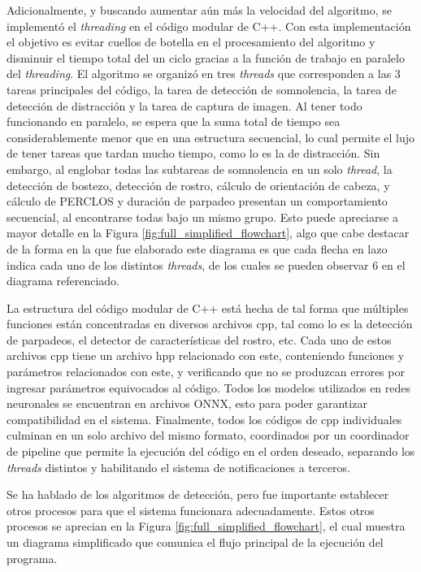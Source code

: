 Adicionalmente, y buscando aumentar aún más la velocidad del algoritmo, se implementó el \textit{threading} en el código modular de C++. Con esta implementación el objetivo es evitar cuellos de botella en el procesamiento del algoritmo y disminuir el tiempo total del un ciclo gracias a la función de trabajo en paralelo del \textit{threading}. El algoritmo se organizó en tres \textit{threads} que corresponden a las 3 tareas principales del código, la tarea de detección de somnolencia, la tarea de detección de distracción y la tarea de captura de imagen. Al tener todo funcionando en paralelo, se espera que la suma total de tiempo sea considerablemente menor que en una estructura secuencial, lo cual permite el lujo de tener tareas que tardan mucho tiempo, como lo es la de distracción. Sin embargo, al englobar todas las subtareas de somnolencia en un solo \textit{thread}, la detección de bostezo, detección de rostro, cálculo de orientación de cabeza, y cálculo de PERCLOS y duración de parpadeo presentan un comportamiento secuencial, al encontrarse todas bajo un mismo grupo. Esto puede apreciarse a mayor detalle en la Figura \ref{fig:full_simplified_flowchart}, algo que cabe destacar de la forma en la que fue elaborado este diagrama es que cada flecha en lazo indica cada uno de los distintos \textit{threads}, de los cuales se pueden observar 6 en el diagrama referenciado.

La estructura del código modular de C++ está hecha de tal forma que múltiples funciones están concentradas en diversos archivos cpp, tal como lo es la detección de parpadeos, el detector de características del rostro, etc. Cada uno de estos archivos cpp tiene un archivo hpp relacionado con este, conteniendo funciones y parámetros relacionados con este, y verificando que no se produzcan errores por ingresar parámetros equivocados al código. Todos los modelos utilizados en redes neuronales se encuentran en archivos ONNX, esto para poder garantizar compatibilidad en el sistema. Finalmente, todos los códigos de cpp individuales culminan en un solo archivo del mismo formato, coordinados por un coordinador de pipeline que permite la ejecución del código en el orden deseado, separando los \textit{threads} distintos y habilitando el sistema de notificaciones a terceros.

Se ha hablado de los algoritmos de detección, pero fue importante establecer otros procesos para que el sistema funcionara adecuadamente. Estos otros procesos se aprecian en la Figura \ref{fig:full_simplified_flowchart}, el cual muestra un diagrama simplificado que comunica el flujo principal de la ejecución del programa. 

